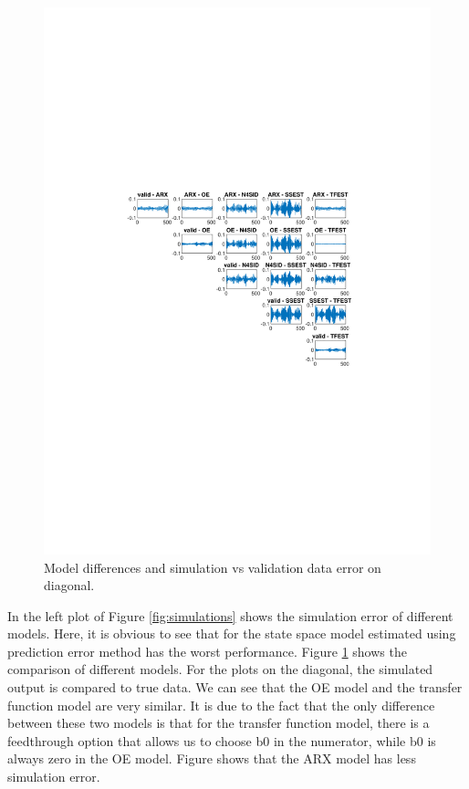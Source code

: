 \documentclass[]{article}
\begin{document}
\begin{figure}[ht]
\centering
\includegraphics[trim= 10cm 8cm 10cm 8cm, scale=0.7]{figures/sim_diff_matrix.pdf}
\caption{Model differences and simulation vs validation data error on diagonal.}
\label{fig:model_differences_simulation}
\end{figure}

In the left plot of Figure \ref{fig:simulations} shows the simulation error of different models. Here, it is obvious to see that for the state space model estimated using prediction error method has the worst performance. Figure \ref{fig:model_differences_simulation} shows the comparison of different models. For the plots on the diagonal, the simulated output is compared to true data. We can see that the OE model and the transfer function model are very similar. It is due to the fact that the only difference between these two models is that for the transfer function model, there is a feedthrough option that allows us to choose b0 in the numerator, while b0 is always zero in the OE model. Figure shows that the ARX model has less simulation error. 
\end{document}
